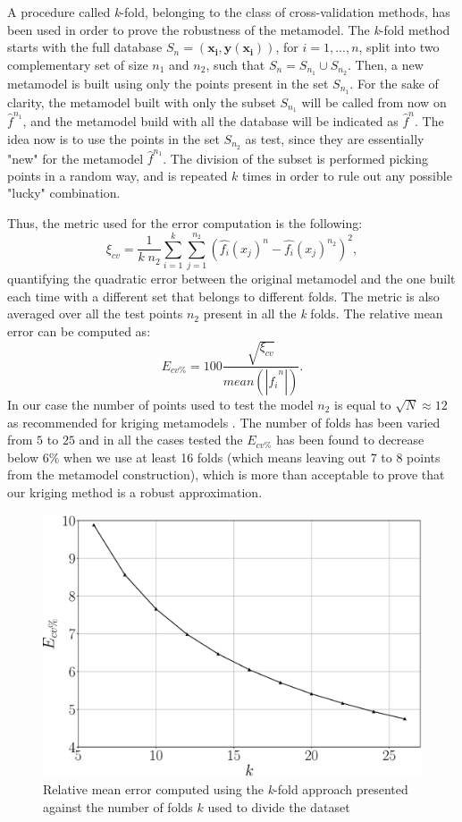 A procedure called \textit{k}-fold, belonging to the class of cross-validation methods, has been used in order to prove the robustness of the metamodel.
The \textit{k}-fold method starts with the full database $S_n = (\mathbf{x_i}, \mathbf{y}(\mathbf{x_i}))$,  for $i=1,...,n$, split into two complementary set of size $n_1$ and $n_2$, such that $S_n = S_{n_1} \cup S_{n_2}$.
Then, a new metamodel is built using only the points present in the set $S_{n_1}$. 
For the sake of clarity, the metamodel built with only the subset $S_{n_1}$ will be called from now on $\hat{f}^{n_1}$, and the metamodel build with all the database will be indicated as $\hat{f}^{n}$.
The idea now is to use the points in the set $S_{n_2}$ as test, since they are essentially "new" for the metamodel $\hat{f}^{n_1}$.
The division of the subset is performed picking points in a random way, and is repeated $k$ times in order to rule out any possible "lucky" combination.

\newpage 
Thus, the metric used for the error computation is the following:
$$
\xi_{cv} = \dfrac{1}{k \; n_2}\sum_{i = 1}^{k} \sum_{j = 1}^{n_2} (\hat{f_{i}}(x_j)^{n} -\hat{f_{i}}(x_j)^{n_2} )^2 ,
$$
quantifying the quadratic error between the original metamodel and the one built each time with a different set that belongs to different folds.
The metric is also averaged over all the test points $n_2$ present in all the \textit{k} folds. 
The relative mean error can be computed as:
$$
E_{cv\%} = 100 \dfrac{\sqrt{\xi_{cv}}}{mean(|\hat{f_{i}}^{n}|)} .
$$
In our case the number of points used to test the model $n_2$ is equal to $\sqrt{N} \approx 12$ as recommended for kriging metamodels \citet{wang2007review}.
The number of folds has been varied from $5$ to $25$ and in all the cases tested the $E_{cv\%}$ has been found to decrease below $6\%$ when we use at least 16 folds (which means leaving out 7 to 8 points from the metamodel construction), which is more than acceptable to prove that our kriging method is a robust approximation.

\begin{figure}[b!]
	\centering
	\includegraphics[width=0.7\linewidth]{chapter_4/figure/kfold_err}
	\caption{Relative mean error computed using the \textit{k}-fold approach presented against the number of folds $k$ used to divide the
		dataset}
	\label{fig:kfold_err}
\end{figure}


